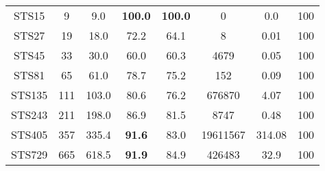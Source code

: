 \begin{longtable}{@{\extracolsep{5pt}}cccccccc}
	\\
	STS15 &
		9 & 9.0 &
			\textbf{100.0}
		&
			\textbf{100.0}
		& 0 & 0.0 & 100
	\\
	STS27 &
		19 & 18.0 &
			72.2
		&
			64.1
		& 8 & 0.01 & 100
	\\
	STS45 &
		33 & 30.0 &
			60.0
		&
			60.3
		& 4679 & 0.05 & 100
	\\
	STS81 &
		65 & 61.0 &
			78.7
		&
			75.2
		& 152 & 0.09 & 100
	\\
	STS135 &
		111 & 103.0 &
			80.6
		&
			76.2
		& 676870 & 4.07 & 100
	\\
	STS243 &
		211 & 198.0 &
			86.9
		&
			81.5
		& 8747 & 0.48 & 100
	\\
	STS405 &
		357 & 335.4 &
			\textbf{91.6}
		&
			83.0
		& 19611567 & 314.08 & 100
	\\
	STS729 &
		665 & 618.5 &
			\textbf{91.9}
		&
			84.9
		& 426483 & 32.9 & 100
	\\
\end{longtable}
